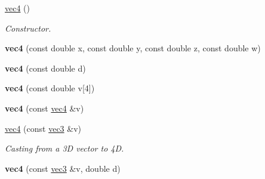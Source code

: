 \begin{DoxyCompactItemize}
\item 
\hypertarget{classutil_1_1math_1_1vec4_a522aa777198ae9db66872010b1fa1672}{\hyperlink{classutil_1_1math_1_1vec4_a522aa777198ae9db66872010b1fa1672}{vec4} ()}\label{classutil_1_1math_1_1vec4_a522aa777198ae9db66872010b1fa1672}

\begin{DoxyCompactList}\small\item\em \-Constructor. \end{DoxyCompactList}\item 
\hypertarget{classutil_1_1math_1_1vec4_a8dc5233310aa4213b7ba925de044c0b7}{{\bfseries vec4} (const double x, const double y, const double z, const double w)}\label{classutil_1_1math_1_1vec4_a8dc5233310aa4213b7ba925de044c0b7}

\item 
\hypertarget{classutil_1_1math_1_1vec4_acd861c0897b379741c47bd7e438b749b}{{\bfseries vec4} (const double d)}\label{classutil_1_1math_1_1vec4_acd861c0897b379741c47bd7e438b749b}

\item 
\hypertarget{classutil_1_1math_1_1vec4_a0e5f0482d051103142bdf5306a64dec6}{{\bfseries vec4} (const double v\mbox{[}4\mbox{]})}\label{classutil_1_1math_1_1vec4_a0e5f0482d051103142bdf5306a64dec6}

\item 
\hypertarget{classutil_1_1math_1_1vec4_ab46de613248e0ee21a6898fa3b354e15}{{\bfseries vec4} (const \hyperlink{classutil_1_1math_1_1vec4}{vec4} \&v)}\label{classutil_1_1math_1_1vec4_ab46de613248e0ee21a6898fa3b354e15}

\end{DoxyCompactItemize}

{\bf }\par
\begin{DoxyCompactItemize}
\item 
\hypertarget{classutil_1_1math_1_1vec4_ad47a8836d5c67a95b7dea49ace33ed96}{\hyperlink{classutil_1_1math_1_1vec4_ad47a8836d5c67a95b7dea49ace33ed96}{vec4} (const \hyperlink{classutil_1_1math_1_1vec3}{vec3} \&v)}\label{classutil_1_1math_1_1vec4_ad47a8836d5c67a95b7dea49ace33ed96}

\begin{DoxyCompactList}\small\item\em \-Casting from a 3\-D vector to 4\-D. \end{DoxyCompactList}\item 
\hypertarget{classutil_1_1math_1_1vec4_ad2702aadf62b774beb197b5e2bb8c720}{{\bfseries vec4} (const \hyperlink{classutil_1_1math_1_1vec3}{vec3} \&v, double d)}\label{classutil_1_1math_1_1vec4_ad2702aadf62b774beb197b5e2bb8c720}

\end{DoxyCompactItemize}

